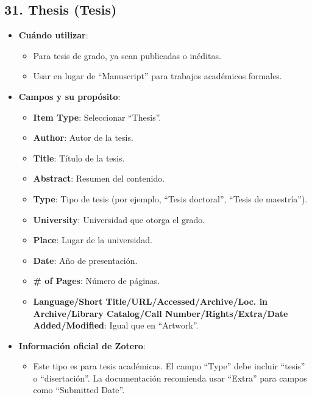 \documentclass[
  jou,
  floatsintext,
  longtable,
  a4paper,
  nolmodern,
  notxfonts,
  notimes,
  colorlinks=true,linkcolor=blue,citecolor=blue,urlcolor=blue]{apa7}
\providecommand{\tightlist}{%
  \setlength{\itemsep}{0pt}\setlength{\parskip}{0pt}}
\begin{document}
\subsection{31. Thesis (Tesis)}\label{thesis-tesis}

\begin{itemize}
\tightlist
\item
  \textbf{Cuándo utilizar}:

  \begin{itemize}
  \tightlist
  \item
    Para tesis de grado, ya sean publicadas o inéditas.
  \item
    Usar en lugar de ``Manuscript'' para trabajos académicos formales.
  \end{itemize}
\item
  \textbf{Campos y su propósito}:

  \begin{itemize}
  \tightlist
  \item
    \textbf{Item Type}: Seleccionar ``Thesis''.
  \item
    \textbf{Author}: Autor de la tesis.
  \item
    \textbf{Title}: Título de la tesis.
  \item
    \textbf{Abstract}: Resumen del contenido.
  \item
    \textbf{Type}: Tipo de tesis (por ejemplo, ``Tesis doctoral'',
    ``Tesis de maestría'').
  \item
    \textbf{University}: Universidad que otorga el grado.
  \item
    \textbf{Place}: Lugar de la universidad.
  \item
    \textbf{Date}: Año de presentación.
  \item
    \textbf{\# of Pages}: Número de páginas.
  \item
    \textbf{Language/Short Title/URL/Accessed/Archive/Loc. in
    Archive/Library Catalog/Call Number/Rights/Extra/Date
    Added/Modified}: Igual que en ``Artwork''.
  \end{itemize}
\item
  \textbf{Información oficial de Zotero}:

  \begin{itemize}
  \tightlist
  \item
    Este tipo es para tesis académicas. El campo ``Type'' debe incluir
    ``tesis'' o ``disertación''. La documentación recomienda usar
    ``Extra'' para campos como ``Submitted Date''.
  \end{itemize}
\end{itemize}
\end{document}
